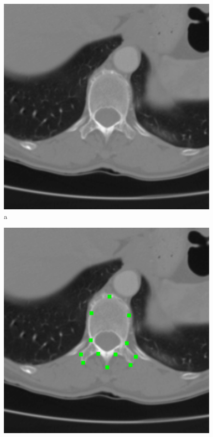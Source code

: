\documentclass[a4paper,11pt,twoside,openright]{report}
\theoremstyle{definition}
\begin{document}
\begin{figure}[h!]
\begin{center}
	\begin{center}
		\includegraphics[width=1.0\textwidth]{174}
		a
	\end{center}
	\endminipage\hfill
	\begin{center}
		\includegraphics[width=1.0\textwidth]{175}

\end{center}
\end{center}
\end{figure}
\end{document}
